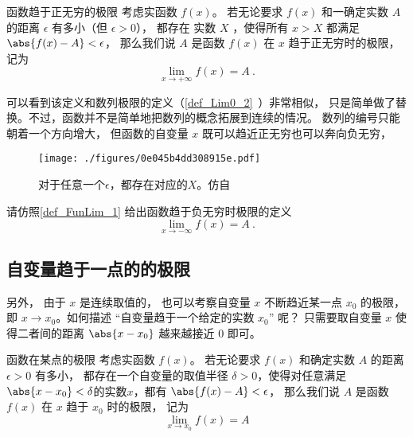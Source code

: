 \begin{definition}{函数趋于正无穷的极限}\label{def_FunLim_1}
考虑实函数 $f(x)$。 若无论要求 $f(x)$ 和一确定实数 $A$ 的距离 $\epsilon$ 有多小（但 $\epsilon>0$）， 都存在 实数 $X$ ，使得所有 $x>X$ 都满足 $\abs{f(x)-A}<\epsilon$， 那么我们说 $A$ 是函数 $f(x)$ 在 $x$ 趋于正无穷时的极限， 记为
\begin{equation}
\lim\limits_{x\to +\infty} f(x) = A~.
\end{equation}
\end{definition}

可以看到该定义和数列极限的定义（\autoref{def_Lim0_2}~）非常相似， 只是简单做了替换。不过，函数并不是简单地把数列的概念拓展到连续的情况。 数列的编号只能朝着一个方向增大， 但函数的自变量 $x$ 既可以趋近正无穷也可以奔向负无穷， 

\begin{figure}[ht]
\centering
\texttt{[image: ./figures/0e045b4dd308915e.pdf]}
\caption{对于任意一个$\epsilon$，都存在对应的$X$。仿自\cite{Thomas}} \label{fig_FunLim_5}
\end{figure}

\begin{exercise}{}
请仿照\autoref{def_FunLim_1} 给出函数趋于负无穷时极限的定义
\begin{equation}
\lim\limits_{x\to -\infty} f(x) = A~.
\end{equation}
\end{exercise}

\subsection{自变量趋于一点的的极限}
另外， 由于 $x$ 是连续取值的， 也可以考察自变量 $x$ 不断趋近某一点 $x_0$ 的极限， 即 $x\to x_0$。如何描述 “自变量趋于一个给定的实数 $x_0$” 呢？ 只需要取自变量 $x$ 使得二者间的距离 $\abs{x-x_0}$ 越来越接近 $0$ 即可。

\begin{definition}{函数在某点的极限}\label{def_FunLim_3}
考虑实函数 $f(x)$。 若无论要求 $f(x)$ 和确定实数 $A$ 的距离 $\epsilon>0$ 有多小， 都存在一个自变量的取值半径 $\delta>0$，使得对任意满足 $\abs{x-x_0} < \delta$的实数$x$，都有 $\abs{f(x)-A}<\epsilon$，
那么我们说 $A$ 是函数 $f(x)$ 在 $x$ 趋于 $x_0$ 时的极限， 记为
\begin{equation}
\lim\limits_{x\to x_0}f(x)=A
\end{equation}
\end{definition}

